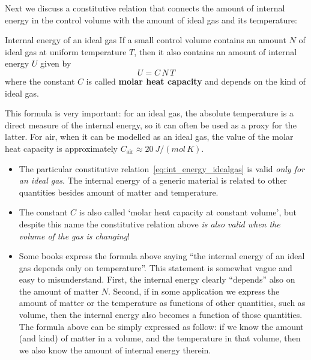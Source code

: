 \documentclass[a4paper,12pt,%
onecolumn,oneside,%
british%
]{memoir}
\renewcommand*{\|}[1][]{\nonscript\:#1\vert\nonscript\:\mathopen{}}
\newcommand*{\yN}{N}
\newcommand*{\yU}{U}
\newcommand*{\yT}{T}%
\begin{document}
Next we discuss a constitutive relation that connects the amount of internal energy in the control volume with the amount of ideal gas and its temperature:

\begin{definition}{Internal energy of an ideal gas}\label{def:internalenergy_gas}
  If a small control volume contains an amount $\yN$ of ideal gas at uniform temperature $\yT$, then it also contains an amount of internal energy $\yU$ given by
  \begin{equation}
    \label{eq:int_energy_idealgas}
    \yU = C\,\yN\,\yT
  \end{equation}
  where the constant $C$ is called \textbf{molar heat capacity} and depends on the kind of ideal gas.
\end{definition}
This formula is very important: for an ideal gas, the absolute temperature is a direct measure of the internal energy, so it can often be used as a proxy for the latter. For air, when it can be modelled as an ideal gas, the value of the molar heat capacity is approximately $C_{\text{air}} \approx \qty{20}{J/(mol\,K)}$.

\begin{warning}
  \begin{itemize}
  \item The particular constitutive relation~\eqref{eq:int_energy_idealgas} is valid \emph{only for an ideal gas}. The internal energy of a generic material is related to other quantities besides amount of matter and temperature.

  \item The constant $C$ is also called \enquote*{molar heat capacity at constant volume}, but despite this name the constitutive relation above \emph{is also valid when the volume of the gas is changing}!

  \item Some books express the formula above saying \enquote{the internal energy of an ideal gas depends only on temperature}. This statement is somewhat vague and easy to misunderstand. First, the internal energy clearly \enquote{depends} also on the amount of matter $\yN$. Second, if in some application we express the amount of matter or the temperature as functions of other quantities, such as volume, then the internal energy also becomes a function of those quantities. The formula above can be simply expressed as follow: if we know the amount (and kind) of matter in a volume, and the temperature in that volume, then we also know the amount of internal energy therein.
  \end{itemize}
\end{warning}
\end{document}
